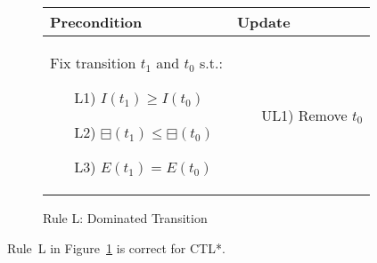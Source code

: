 \begin{figure}[h!]
    \vspace{5mm}
    \begin{adjustbox}{center}
        \begin{tabular}{|p{55mm}|p{45mm}|} \hline
        Precondition & Update \\ \hline
        Fix transition $t_1$ and $t_0$ s.t.:
        \begin{itemize}[leftmargin=10mm]
            \item[L1)] $I(t_1)\geq I(t_0)$
            \item[L2)] $\boxminus(t_1)\leq \boxminus(t_0)$
            \item[L3)] $E(t_1)=E(t_0)$
        \end{itemize}
        &
        \begin{itemize}[leftmargin=10mm]
            \item[UL1)] Remove $t_0$
        \end{itemize} \\ \hline
        \end{tabular}
    \end{adjustbox}
    \caption{Rule L: Dominated Transition}
    \label{fig:rule_l}
\end{figure}

\begin{theorem}
    Rule~L in Figure~\ref{fig:rule_l} is correct for CTL*.
\end{theorem}
